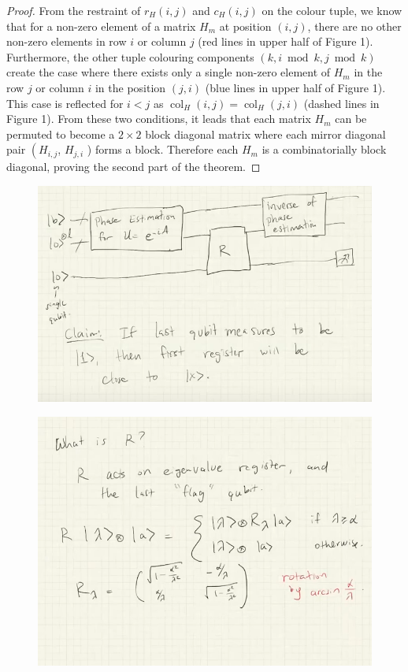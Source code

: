 \documentclass[
10pt, %
a4paper, %
oneside, %
headinclude,footinclude, %
BCOR5mm, %
]{scrartcl}
\begin{document}
\begin{proof}
From the restraint of $r_{H}(i, j)$ and $c_{H}(i, j)$ on the colour tuple, we know that for a non-zero element of a matrix $H_{m}$ at position $(i, j)$, there are no other non-zero elements in row $i$ or column $j$ (red lines in upper half of Figure 1). Furthermore, the other tuple colouring components $(k, i \bmod k, j \bmod k)$ create the case where there exists only a single non-zero element of $H_{m}$ in the row $j$ or column $i$ in the position $(j, i)$ (blue lines in upper half of Figure 1). This case is reflected for $i<j$ as $\operatorname{col}_{H}(i, j)=\operatorname{col}_{H}(j, i)$ (dashed lines in Figure 1). From these two conditions, it leads that each matrix $H_{m}$ can be permuted to become a $2 \times 2$ block diagonal matrix where each mirror diagonal pair $\left(H_{i, j}\right.$, $H_{j, i}$ ) forms a block. Therefore each $H_{m}$ is a combinatorially block diagonal, proving the second part of the theorem.
\end{proof}

\begin{figure}[H]
    \centering
    \includegraphics[width=\linewidth]{images/use case1.png}
\end{figure}

\begin{figure}[H]
    \centering
    \includegraphics[width=\linewidth]{images/usecase2.png}
\end{figure}
\end{document}
